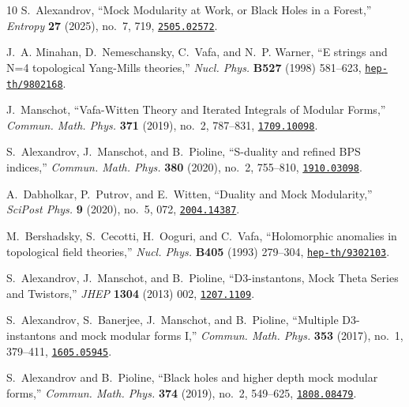 \documentclass[12pt,letterpaper]{JHEP3}
\begin{document}
\begin{thebibliography}{10}
	S.~Alexandrov, ``{Mock Modularity at Work, or Black Holes in a Forest},'' {\em
		Entropy} {\bf 27} (2025), no.~7, 719,
	\href{http://www.arXiv.org/abs/2505.02572}{{\tt 2505.02572}}.
	
	J.~A. Minahan, D.~Nemeschansky, C.~Vafa, and N.~P. Warner, ``{E strings and N=4
		topological Yang-Mills theories},'' {\em Nucl. Phys.} {\bf B527} (1998)
	581--623,
	\href{http://www.arXiv.org/abs/hep-th/9802168}{{\tt hep-th/9802168}}.
	
	J.~Manschot, ``{Vafa-Witten Theory and Iterated Integrals of Modular Forms},''
	{\em Commun. Math. Phys.} {\bf 371} (2019), no.~2, 787--831,
	\href{http://www.arXiv.org/abs/1709.10098}{{\tt 1709.10098}}.
	
	S.~Alexandrov, J.~Manschot, and B.~Pioline, ``{S-duality and refined BPS
		indices},'' {\em Commun. Math. Phys.} {\bf 380} (2020), no.~2, 755--810,
	\href{http://www.arXiv.org/abs/1910.03098}{{\tt 1910.03098}}.
	
	A.~Dabholkar, P.~Putrov, and E.~Witten, ``{Duality and Mock Modularity},'' {\em
		SciPost Phys.} {\bf 9} (2020), no.~5, 072,
	\href{http://www.arXiv.org/abs/2004.14387}{{\tt 2004.14387}}.
	
	M.~Bershadsky, S.~Cecotti, H.~Ooguri, and C.~Vafa, ``Holomorphic anomalies in
	topological field theories,'' {\em Nucl. Phys.} {\bf B405} (1993) 279--304,
	\href{http://www.arXiv.org/abs/hep-th/9302103}{{\tt hep-th/9302103}}.
	
	S.~Alexandrov, J.~Manschot, and B.~Pioline, ``{D3-instantons, Mock Theta Series
		and Twistors},'' {\em JHEP} {\bf 1304} (2013) 002,
	\href{http://www.arXiv.org/abs/1207.1109}{{\tt 1207.1109}}.
	
	S.~Alexandrov, S.~Banerjee, J.~Manschot, and B.~Pioline, ``{Multiple
		D3-instantons and mock modular forms I},'' {\em Commun. Math. Phys.} {\bf
		353} (2017), no.~1, 379--411,
	\href{http://www.arXiv.org/abs/1605.05945}{{\tt 1605.05945}}.
	
	S.~Alexandrov and B.~Pioline, ``{Black holes and higher depth mock modular
		forms},'' {\em Commun. Math. Phys.} {\bf 374} (2019), no.~2, 549--625,
	\href{http://www.arXiv.org/abs/1808.08479}{{\tt 1808.08479}}.
	

\end{thebibliography}
\end{document}
